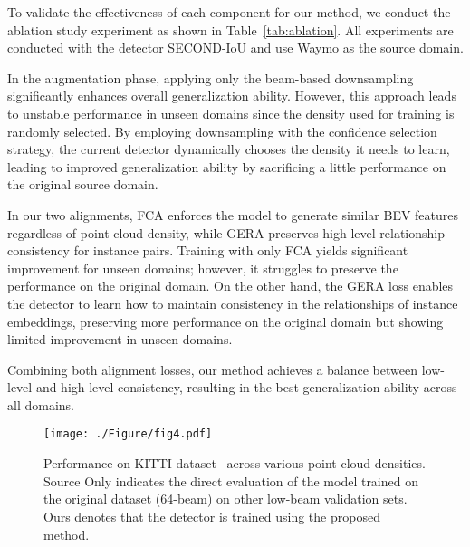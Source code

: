 
To validate the effectiveness of each component for our method, we conduct the ablation study experiment as shown in Table~\ref{tab:ablation}. All experiments are conducted with the detector SECOND-IoU and use Waymo as the source domain.  

In the augmentation phase, applying only the beam-based downsampling significantly enhances overall generalization ability. However, this approach leads to unstable performance in unseen domains since the density used for training is randomly selected. By employing downsampling with the confidence selection strategy, the current detector dynamically chooses the density it needs to learn, leading to improved generalization ability by sacrificing a little performance on the original source domain. 

In our two alignments, FCA enforces the model to generate similar BEV features regardless of point cloud density, while GERA preserves high-level relationship consistency for instance pairs. Training with only FCA yields significant improvement for unseen domains; however, it struggles to preserve the performance on the original domain. On the other hand, the GERA loss enables the detector to learn how to maintain consistency in the relationships of instance embeddings, preserving more performance on the original domain but showing limited improvement in unseen domains.

Combining both alignment losses, our method achieves a balance between low-level and high-level consistency, resulting in the best generalization ability across all domains.

\begin{figure}[h!]
\centering
\texttt{[image: ./Figure/fig4.pdf]}
\caption{Performance on KITTI dataset~\cite{geiger2012we} across various point cloud densities. Source Only indicates the direct evaluation of the model trained on the original dataset (64-beam) on other low-beam validation sets.  Ours denotes that the detector is trained using the proposed method. 
}
\label{fig4}
\end{figure}

